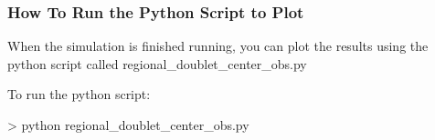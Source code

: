 \documentclass{beamer}
\begin{document}
\begin{frame}[fragile]\frametitle{How To Run the Python Script to Plot}

When the simulation is finished running, you can plot the results using
the python script called regional\_doublet\_center\_obs.py

To run the python script:

\begin{semiverbatim}

 > python regional_doublet_center_obs.py

\end{semiverbatim}

\end{frame}
\end{document}
